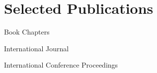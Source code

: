 \section{Selected Publications}


\begin{pubSubsectionNum}{Book Chapters}
  \item \href{https://github.com/SLAM-Handbook-contributors/slam-handbook-public-release}{}
\end{pubSubsectionNum}

\vspace{-2mm}
\begin{pubSubsectionNum}{International Journal}
  \item {}
  \item {}
  \item {}
  \item {}
  \item {}
  \item {}
  \item {}
\end{pubSubsectionNum}

\vspace{-2mm}
\begin{pubSubsectionNum}{International Conference Proceedings}
  \item {}
  \item {}
  \item {}
  \item {}
  \item {}
  \item {}
  \item {}
  \item {}
  \item {}
  \item {}
\end{pubSubsectionNum}

